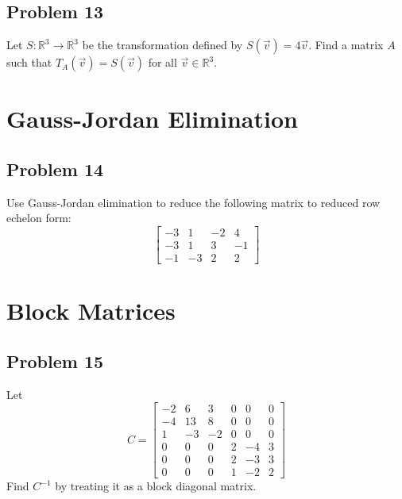 \documentclass[a4paper, 12pt]{article}
\begin{document}
\subsection*{Problem 13}
Let $S: \mathbb{R}^3 \to \mathbb{R}^3$ be the transformation defined by $S(\vec{v}) = 4\vec{v}$. Find a matrix $A$ such that $T_A(\vec{v}) = S(\vec{v})$ for all $\vec{v} \in \mathbb{R}^3$.

\section*{Gauss-Jordan Elimination}

\subsection*{Problem 14}
Use Gauss-Jordan elimination to reduce the following matrix to reduced row echelon form:
\[
\begin{bmatrix}
-3 & 1 & -2 & 4 \\
-3 & 1 & 3 & -1 \\
-1 & -3 & 2 & 2
\end{bmatrix}
\]

\section*{Block Matrices}

\subsection*{Problem 15}
Let
\[
C = \begin{bmatrix}
-2 & 6 & 3 & 0 & 0 & 0 \\
-4 & 13 & 8 & 0 & 0 & 0 \\
1 & -3 & -2 & 0 & 0 & 0 \\
0 & 0 & 0 & 2 & -4 & 3 \\
0 & 0 & 0 & 2 & -3 & 3 \\
0 & 0 & 0 & 1 & -2 & 2
\end{bmatrix}
\]
Find $C^{-1}$ by treating it as a block diagonal matrix.
\end{document}
